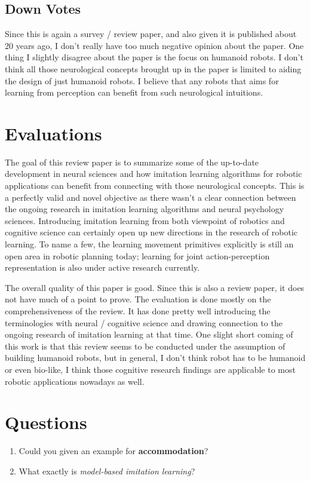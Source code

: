 \documentclass[10pt, twocolumn]{article}
\begin{document}
\subsection{Down Votes}
Since this is again a survey / review paper, and also given it is published about
20 years ago, I don't really have too much negative opinion
about the paper. One thing I slightly disagree about the paper is the focus on
humanoid robots. I don't think all those neurological concepts brought up
in the paper is limited to aiding the design of just humanoid robots. I believe
that any robots that aims for learning from perception can benefit from such
neurological intuitions.

\section{Evaluations}
The goal of this review paper is to summarize some of the up-to-date development
in neural sciences and how imitation learning algorithms for robotic applications
can benefit from connecting with those neurological concepts. This is a perfectly
valid and novel objective as there wasn't a clear connection between
the ongoing research in imitation learning algorithms and neural psychology
sciences. Introducing imitation learning from both viewpoint of robotics and
cognitive science can certainly open up new directions in the research of
robotic learning. To name a few, the learning movement primitives explicitly
is still an open area in robotic planning today; learning for joint action-perception
representation is also under active research currently.

The overall quality of this paper is good. Since this is also a review paper,
it does not have much of a point to prove. The evaluation is done mostly on
the comprehensiveness of the review. It has done pretty well introducing the
terminologies with neural / cognitive science and drawing connection to
the ongoing research of imitation learning at that time. One slight
short coming of this work is that this review seems to be
conducted under the assumption of building humanoid robots, but in general, I don't
think robot has to be humanoid or even bio-like, I think those cognitive
research findings are applicable to most robotic applications nowadays as well.

\section{Questions}
\begin{enumerate}
  \item Could you given an example for \textbf{accommodation}?
  \item What exactly is \textit{model-based imitation learning}?
\end{enumerate}
\end{document}
